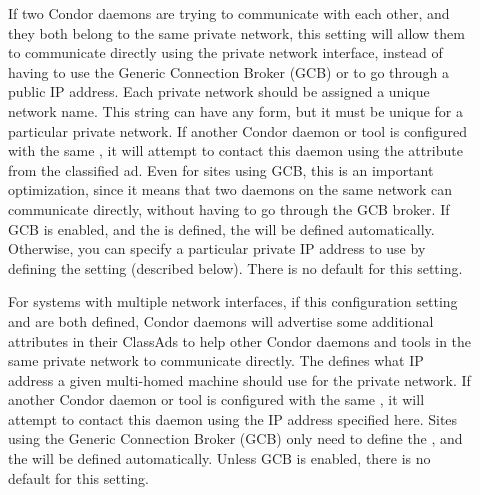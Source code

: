 \begin{description}
\item[] \label{param:PrivateNetworkName}
  If two Condor daemons are trying to communicate with each other, and
  they both belong to the same private network, this setting will
  allow them to communicate directly using the private network
  interface, instead of having to use the Generic Connection Broker
  (GCB) or to go through a public IP address.
  Each private network should be assigned a unique network name.
  This string can have any form, but it must be unique for a
  particular private network.
  If another Condor daemon or tool is configured with the same
  , it will attempt to contact this
  daemon using the  attribute from the classified
  ad.
  Even for sites using GCB, this is an important optimization, since
  it means that two daemons on the same network can communicate
  directly, without having to go through the GCB broker.
  If GCB is enabled, and the  is
  defined, the  will be defined automatically.
  Otherwise, you can specify a particular private IP address to use by
  defining the  setting
  (described below).
  There is no default for this setting.

\item[] \label{param:PrivateNetworkInterface}
  For systems with multiple network interfaces, if this configuration
  setting and  are both defined,
  Condor daemons will advertise some additional attributes in their
  ClassAds to help other Condor daemons and tools in the same private
  network to communicate directly.
  The  defines what IP address a
  given multi-homed machine should use for the private network.
  If another Condor daemon or tool is configured with the same
  , it will attempt to contact this
  daemon using the IP address specified here.
  Sites using the Generic Connection Broker (GCB) only need to define
  the , and the 
   will be defined automatically.
  Unless GCB is enabled, there is no default for this setting.


\end{description}
